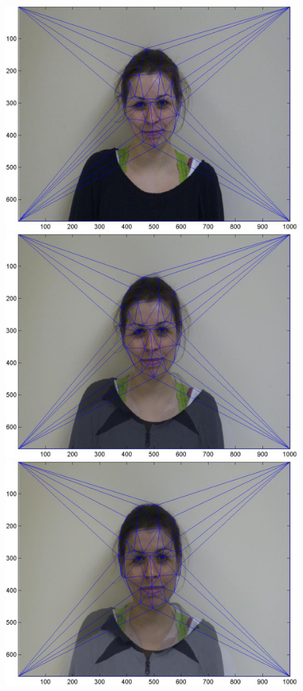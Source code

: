 \documentclass[11pt]{article}
\begin{document}
\begin{figure} [ht]
\begin{center}
\includegraphics[scale=0.1]{figs/triang/1.jpg}  
\includegraphics[scale=0.1]{figs/triang/3.jpg}  
\includegraphics[scale=0.1]{figs/triang/5.jpg}  

\end{center}
\end{figure}
\end{document}
